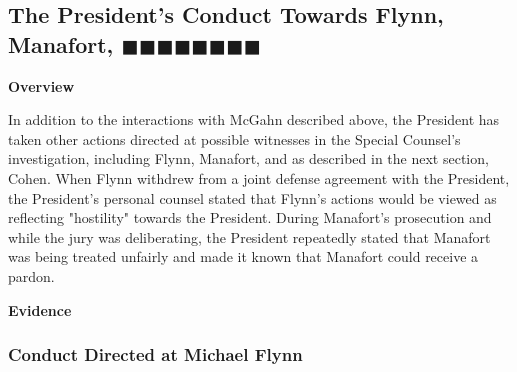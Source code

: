 {\subsection{The President's Conduct Towards Flynn, Manafort, $\blacksquare\blacksquare\blacksquare\blacksquare\blacksquare\blacksquare\blacksquare\blacksquare$}

\begin{center}
\textbf{Overview}
\end{center}

In addition to the interactions with McGahn described above, the President has taken other actions directed at possible witnesses in the Special Counsel's investigation, including Flynn, Manafort,  and as described in the next section, Cohen.
When Flynn withdrew from a joint defense agreement with the President, the President's personal counsel stated that Flynn's actions would be viewed as reflecting "hostility" towards the President.
During Manafort's prosecution and while the jury was deliberating, the President repeatedly stated that Manafort was being treated unfairly and made it known that Manafort could receive a pardon.

\begin{center}
\textbf{Evidence}
\end{center}

\subsubsection{Conduct Directed at Michael Flynn}

}
